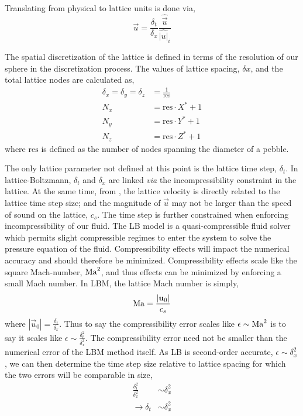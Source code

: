 Translating from physical to lattice units is done via,
\begin{equation}
	\vec{u} = \frac{\delta_t}{\delta_x}\frac{\hat{\vec{u}}}{\hat{|u|}_i}
\end{equation}

The spatial discretization of the lattice is defined in terms of the resolution of our sphere in the discretization process. The values of lattice spacing, $\delta x$, and the total lattice nodes are calculated as,
\begin{subequations}
\begin{align}
	\delta_x = \delta_y = \delta_z & = \frac{1}{\text{res}} \\
	N_x & = \text{res}\cdot X^* +1\\
	N_y & = \text{res}\cdot Y^* +1\\
	N_z & = \text{res}\cdot Z^*+1
\end{align}
\end{subequations}
where $\text{res}$ is defined as the number of nodes spanning the diameter of a pebble. 

The only lattice parameter not defined at this point is the lattice time step, $\delta_t$. In lattice-Boltzmann, $\delta_t$ and $\delta_x$ are linked \textit{via} the incompressibility constraint in the lattice. At the same time, from , the lattice velocity is directly related to the lattice time step size; and the magnitude of $\vec{u}$ may not be larger than the speed of sound on the lattice, $c_s$. The time step is further constrained when enforcing incompressibility of our fluid. The LB model is a quasi-compressible fluid solver which permits slight compressible regimes to enter the system to solve the pressure equation of the fluid. Compressibility effects will impact the numerical accuracy and should therefore be minimized. Compressibility effects scale like the square Mach-number, $\mathrm{Ma}^2$, and thus effects can be minimized by enforcing a small Mach number. In LBM, the lattice Mach number is simply,
\begin{equation}
 	\mathrm{Ma} = \frac{|\mathbf{u}_0|}{c_s}
\end{equation}
where $|\vec{u}_0| = \frac{\delta_t}{\delta_x}$. Thus to say the compressibility error scales like $\epsilon \sim \mathrm{Ma}^2$ is to say it scales like $\epsilon \sim \frac{\delta_t^2}{\delta_x^2}$. The compressibility error need not be smaller than the numerical error of the LBM method itself. As LB is second-order accurate\cite{succi2001lattice}, $\epsilon \sim \delta_x^2$, we can then determine the time step size relative to lattice spacing for which the two errors will be comparable in size,
\begin{align*}
	\frac{\delta_t^2}{\delta_x^2} &\sim \delta_x^2\\
	\rightarrow \delta_t &\sim \delta_x^2
\end{align*}

